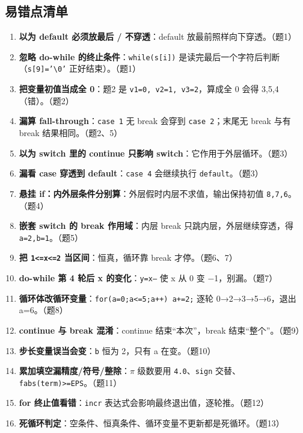 \documentclass[UTF8,zihao=-4,a4paper]{ctexart}
\begin{document}
\subsection{易错点清单}
\begin{yicuodian}
\begin{enumerate}
  \item \textbf{以为 default 必须放最后 / 不穿透}：default 放最前照样向下穿透。（题1）
  \item \textbf{忽略 do-while 的终止条件}：\texttt{while(s[i])} 是读完最后一个字符后判断（\texttt{s[9]='\textbackslash 0'} 正好结束）。（题1）
  \item \textbf{把变量初值当成全 0}：题2 是 \texttt{v1=0,\ v2=1,\ v3=2}，算成全 0 会得 3,5,4（错）。（题2）
  \item \textbf{漏算 fall-through}：\texttt{case 1} 无 break 会穿到 \texttt{case 2}；末尾无 break 与有 break 结果相同。（题2、5）
  \item \textbf{以为 switch 里的 continue 只影响 switch}：它作用于外层循环。（题3）
  \item \textbf{漏看 case 穿透到 default}：\texttt{case 4} 会继续执行 \texttt{default}。（题3）
  \item \textbf{悬挂 if：内外层条件分别算}：外层假时内层不求值，输出保持初值 \texttt{8,7,6}。（题4）
  \item \textbf{嵌套 switch 的 break 作用域}：内层 break 只跳内层，外层继续穿透，得 \texttt{a=2,b=1}。（题5）
  \item \textbf{把 \texttt{1<=x<=2} 当区间}：恒真，循环靠 break 才停。（题6、7）
  \item \textbf{do-while 第 4 轮后 x 的变化}：\texttt{y=x--} 使 x 从 0 变 −1，别漏。（题7）
  \item \textbf{循环体改循环变量}：\texttt{for(a=0;a<=5;a++) a+=2;} 逐轮 0→2→3→5→6，退出 a=6。（题8）
  \item \textbf{continue 与 break 混淆}：continue 结束“本次”，break 结束“整个”。（题9）
  \item \textbf{步长变量误当会变}：\texttt{b} 恒为 2，只有 a 在变。（题10）
  \item \textbf{累加填空漏精度/符号/整除}：$\pi$ 级数要用 \texttt{4.0}、\texttt{sign} 交替、\texttt{fabs(term)>=EPS}。（题11）
  \item \textbf{for 终止值看错}：\texttt{incr} 表达式会影响最终退出值，逐轮推。（题12）
  \item \textbf{死循环判定}：空条件、恒真条件、循环变量不更新都是死循环。（题13）
\end{enumerate}
\end{yicuodian}
\end{document}
